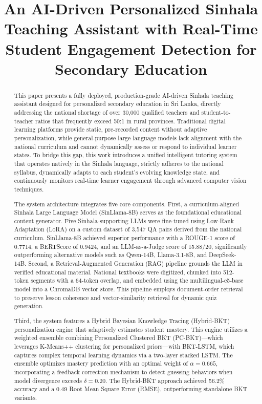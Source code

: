 \documentclass[conference]{IEEEtran}
\begin{document}
\title{An AI-Driven Personalized Sinhala Teaching Assistant with Real-Time Student Engagement Detection for Secondary Education}

\author{}

\maketitle
\vspace{-2em}
\begin{abstract}
This paper presents a fully deployed, production-grade AI-driven Sinhala teaching assistant designed for personalized secondary education in Sri Lanka, directly addressing the national shortage of over 30,000 qualified teachers and student-to-teacher ratios that frequently exceed 50:1 in rural provinces. Traditional digital learning platforms provide static, pre-recorded content without adaptive personalization, while general-purpose large language models lack alignment with the national curriculum and cannot dynamically assess or respond to individual learner states. To bridge this gap, this work introduces a unified intelligent tutoring system that operates natively in the Sinhala language, strictly adheres to the national syllabus, dynamically adapts to each student's evolving knowledge state, and continuously monitors real-time learner engagement through advanced computer vision techniques.

The system architecture integrates five core components. First, a curriculum-aligned Sinhala Large Language Model (SinLlama-8B) serves as the foundational educational content generator. Five Sinhala-supporting LLMs were fine-tuned using Low-Rank Adaptation (LoRA) on a custom dataset of 3,547 QA pairs derived from the national curriculum. SinLlama-8B achieved superior performance with a ROUGE-1 score of 0.7714, a BERTScore of 0.9424, and an LLM-as-a-Judge score of 15.88/20, significantly outperforming alternative models such as Qwen-14B, Llama-3.1-8B, and DeepSeek-14B. Second, a Retrieval-Augmented Generation (RAG) pipeline grounds the LLM in verified educational material. National textbooks were digitized, chunked into 512-token segments with a 64-token overlap, and embedded using the multilingual-e5-base model into a ChromaDB vector store. This pipeline employs document-order retrieval to preserve lesson coherence and vector-similarity retrieval for dynamic quiz generation.

Third, the system features a Hybrid Bayesian Knowledge Tracing (Hybrid-BKT) personalization engine that adaptively estimates student mastery. This engine utilizes a weighted ensemble combining Personalized Clustered BKT (PC-BKT)---which leverages K-Means++ clustering for personalized priors---with BKT-LSTM, which captures complex temporal learning dynamics via a two-layer stacked LSTM. The ensemble optimizes mastery prediction with an optimal weight of $\alpha=0.665$, incorporating a feedback correction mechanism to detect guessing behaviors when model divergence exceeds $\delta=0.20$. The Hybrid-BKT approach achieved 56.2\% accuracy and a 0.49 Root Mean Square Error (RMSE), outperforming standalone BKT variants.


\end{abstract}
\end{document}
